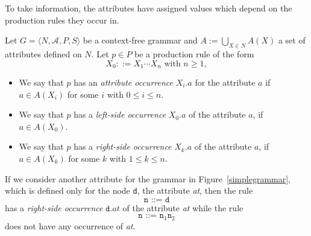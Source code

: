 To take information, the attributes have assigned values which depend on the production rules they occur in.
%
\begin{definition}
Let $G=\langle N, \mathcal{A}, P, S\rangle$ be a context-free grammar and $A:=\bigcup_{X\in N} A(X)$ a set of attributes defined on $N$.
Let $p\in P$
be a production rule of the form \[X_0 ::= X_1 \cdots X_n \text{ with } n\geq 1,
\]
\begin{itemize}
\item We say that $p$ has
an \emph{attribute occurrence} $X_i.a$ for the attribute $a$ if $a \in A(X_i)$ for some $i$ with $0\leq i \leq n$.
\item We say that $p$ has a \emph{left-side occurrence}  $X_0.a$ of the attribute $a$, if $a\in A(X_0)$.  
\item We say that $p$ has a \emph{right-side occurrence}  $X_k.a$ of the attribute $a$, if $a\in A(X_k)$ for some $k$ with $1 \leq k \leq n$.
\end{itemize}
\end{definition} 

If we consider another attribute for the grammar in Figure~\ref{simplegrammar}, which is defined only for the node \texttt{d}, the attribute \textit{at},
then the rule
\[
 \texttt{n ::= d} 
\]
has a \emph{right-side occurrence} $\texttt{d}.\textit{at}$ of the attribute \textit{at} while the rule
\[
 \texttt{n ::= n}_1 \texttt{n}_2
\]
does not have any occurrence of \textit{at}.

